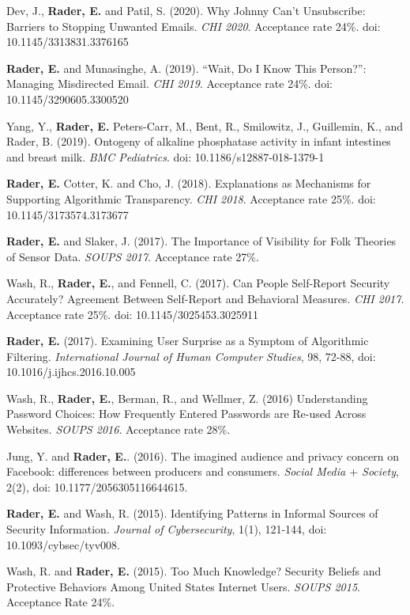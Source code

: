 \documentclass[9pt]{extarticle}
\begin{document}
Dev, J., \textbf{Rader, E.} and Patil, S. (2020). Why Johnny Can't Unsubscribe: Barriers to Stopping Unwanted Emails. \emph{CHI 2020}. Acceptance rate 24\%. doi: 10.1145/3313831.3376165

\textbf{Rader, E.} and Munasinghe, A. (2019). ``Wait, Do I Know This Person?'': Managing Misdirected Email.  \emph{CHI 2019}. Acceptance rate 24\%. doi: 10.1145/3290605.3300520

Yang, Y., \textbf{Rader, E.} Peters-Carr, M., Bent, R., Smilowitz, J., Guillemin, K., and Rader, B. (2019). Ontogeny of alkaline phosphatase activity in infant intestines and breast milk. \emph{BMC Pediatrics}. doi: 10.1186/s12887-018-1379-1

\textbf{Rader, E.} Cotter, K. and Cho, J. (2018). Explanations as Mechanisms for Supporting Algorithmic Transparency.  \emph{CHI 2018}. Acceptance rate 25\%. doi: 10.1145/3173574.3173677

\textbf{Rader, E.} and Slaker, J. (2017). The Importance of Visibility for Folk Theories of Sensor Data. \emph{SOUPS 2017}. Acceptance rate 27\%. 

Wash, R., \textbf{Rader, E.}, and Fennell, C. (2017). Can People Self-Report Security Accurately? Agreement Between Self-Report and Behavioral Measures. \emph{CHI 2017}. Acceptance rate 25\%. doi: 10.1145/3025453.3025911

\textbf{Rader, E.} (2017). Examining User Surprise as a Symptom of Algorithmic Filtering. \emph{International Journal of Human Computer Studies}, 98, 72-88, doi: 10.1016/j.ijhcs.2016.10.005

Wash, R., \textbf{Rader, E.}, Berman, R., and Wellmer, Z. (2016) Understanding Password Choices: How Frequently Entered Passwords are Re-used Across Websites. \emph{SOUPS 2016}. Acceptance rate 28\%.

Jung, Y. and \textbf{Rader, E.}. (2016). The imagined audience and privacy concern on Facebook: differences between producers and consumers. \emph{Social Media $+$ Society}, 2(2), doi: 10.1177/2056305116644615.

\textbf{Rader, E.} and Wash, R. (2015). Identifying Patterns in Informal Sources of Security Information. \emph{Journal of Cybersecurity}, 1(1), 121-144, doi: 10.1093/cybsec/tyv008.

Wash, R. and \textbf{Rader, E.} (2015). Too Much Knowledge? Security Beliefs and Protective Behaviors Among United States Internet Users. \emph{SOUPS 2015}. Acceptance Rate 24\%.
\end{document}
